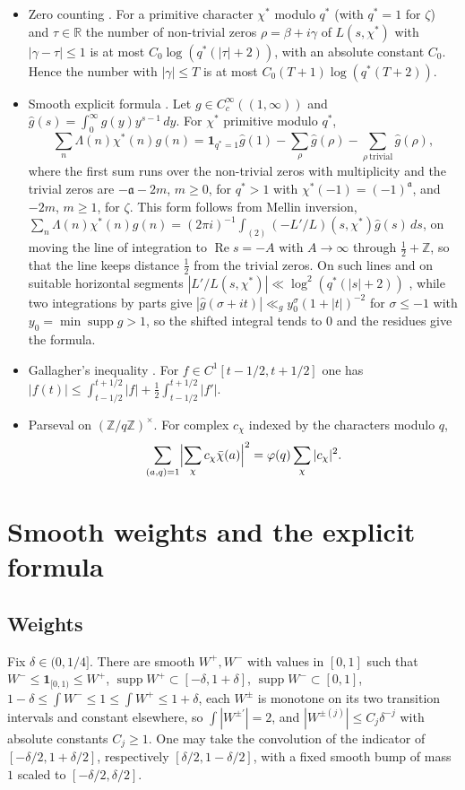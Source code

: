 \documentclass[11pt]{amsart}
\theoremstyle{definition}
\numberwithin{equation}{section}
\newcommand{\re}{\operatorname{Re}}
\begin{document}
\begin{itemize}
\item[(F1)] Zero counting \cite[Ch.~15, 16]{Dav}. For a primitive character $\chi^*$ modulo $q^*$ (with $q^*=1$ for $\zeta$) and $\tau\in\mathbb R$ the number of non-trivial zeros $\rho=\beta+i\gamma$ of $L(s,\chi^*)$ with $|\gamma-\tau|\le1$ is at most $C_0\log(q^*(|\tau|+2))$, with an absolute constant $C_0$. Hence the number with $|\gamma|\le T$ is at most $C_0(T+1)\log(q^*(T+2))$.
\item[(F2)] Smooth explicit formula \cite[\S5.5]{IK}. Let $g\in C_c^\infty((1,\infty))$ and $\hat g(s)=\int_0^\infty g(y)y^{s-1}\,dy$. For $\chi^*$ primitive modulo $q^*$,
\[
\sum_n\Lambda(n)\chi^*(n)g(n)=\mathbf 1_{q^*=1}\hat g(1)-\sum_\rho\hat g(\rho)-\sum_{\rho\ \mathrm{trivial}}\hat g(\rho),
\]
where the first sum runs over the non-trivial zeros with multiplicity and the trivial zeros are $-\mathfrak a-2m$, $m\ge0$, for $q^*>1$ with $\chi^*(-1)=(-1)^{\mathfrak a}$, and $-2m$, $m\ge1$, for $\zeta$. This form follows from Mellin inversion, $\sum_n\Lambda(n)\chi^*(n)g(n)=(2\pi i)^{-1}\int_{(2)}(-L'/L)(s,\chi^*)\hat g(s)\,ds$, on moving the line of integration to $\re s=-A$ with $A\to\infty$ through $\frac12+\mathbb Z$, so that the line keeps distance $\frac12$ from the trivial zeros. On such lines and on suitable horizontal segments $|L'/L(s,\chi^*)|\ll\log^2(q^*(|s|+2))$ \cite[Ch.~17, 19]{Dav}, while two integrations by parts give $|\hat g(\sigma+it)|\ll_gy_0^{\sigma}(1+|t|)^{-2}$ for $\sigma\le-1$ with $y_0=\min\operatorname{supp}g>1$, so the shifted integral tends to $0$ and the residues give the formula.
\item[(F3)] Gallagher's inequality \cite[Lemma~1]{Gal70}. For $f\in C^1[t-1/2,t+1/2]$ one has $|f(t)|\le\int_{t-1/2}^{t+1/2}|f|+\frac12\int_{t-1/2}^{t+1/2}|f'|$.
\item[(F4)] Parseval on $(\mathbb Z/q\mathbb Z)^\times$. For complex $c_\chi$ indexed by the characters modulo $q$,
\[
\sum_{(a,q)=1}\Bigl|\sum_\chi c_\chi\bar\chi(a)\Bigr|^2=\varphi(q)\sum_\chi|c_\chi|^2.
\]
\end{itemize}

\section{Smooth weights and the explicit formula}\label{sec:explicit}

\subsection{Weights}
Fix $\delta\in(0,1/4]$. There are smooth $W^+,W^-$ with values in $[0,1]$ such that $W^-\le\mathbf 1_{[0,1)}\le W^+$, $\operatorname{supp}W^+\subset[-\delta,1+\delta]$, $\operatorname{supp}W^-\subset[0,1]$, $1-\delta\le\int W^-\le1\le\int W^+\le1+\delta$, each $W^\pm$ is monotone on its two transition intervals and constant elsewhere, so $\int|W^{\pm\prime}|=2$, and $|W^{\pm(j)}|\le C_j\delta^{-j}$ with absolute constants $C_j\ge1$. One may take the convolution of the indicator of $[-\delta/2,1+\delta/2]$, respectively $[\delta/2,1-\delta/2]$, with a fixed smooth bump of mass $1$ scaled to $[-\delta/2,\delta/2]$.
\end{document}
